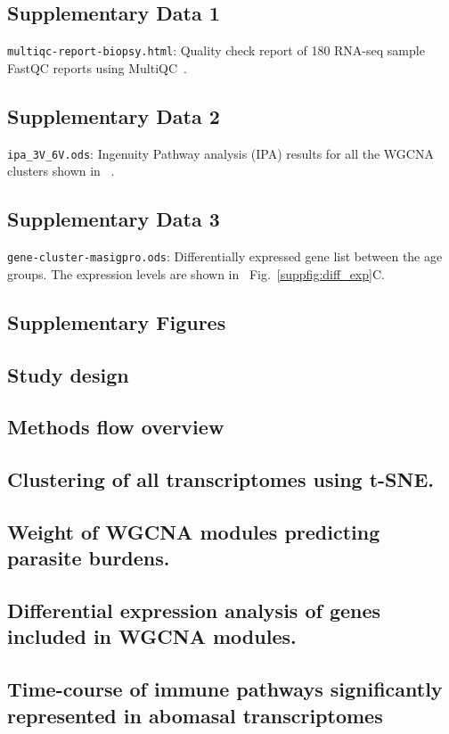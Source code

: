 \documentclass[a4paper, hidelinks, 11pt]{article}
\begin{document}
\subsection{Supplementary Data 1}\label{supdata:multiqc}
\texttt{multiqc-report-biopsy.html}: Quality check report of 180 RNA-seq sample FastQC reports using MultiQC~\supercite{Ewels2016}.

\subsection{Supplementary Data 2}\label{supdata:ipa}
\texttt{ipa\_3V\_6V.ods}: Ingenuity Pathway analysis (IPA) results for all the WGCNA clusters shown in ~.

\subsection{Supplementary Data 3}\label{supdata:diffexp}
\texttt{gene-cluster-masigpro.ods}: Differentially expressed gene list between the age groups. The expression levels are shown in ~Fig.~\ref{suppfig:diff_exp}C.

\subsection{Supplementary Figures}
\newcommand{\subsectionbreak}{\clearpage}

\subsection{Study design}

\SuppFigTimeline

\subsection{Methods flow overview}

\SuppFigFlow

\subsection{Clustering of all transcriptomes using t-SNE.}

\SuppFigTSNE

\subsection{Weight of WGCNA modules predicting parasite burdens.}

\SuppFigEnetmodules

\subsection{Differential expression analysis of genes included in WGCNA modules.}

\SuppFigDiffexp

\subsection{Time-course of immune pathways significantly
represented in abomasal transcriptomes}

\SuppFigPathwayDynamics
\end{document}
